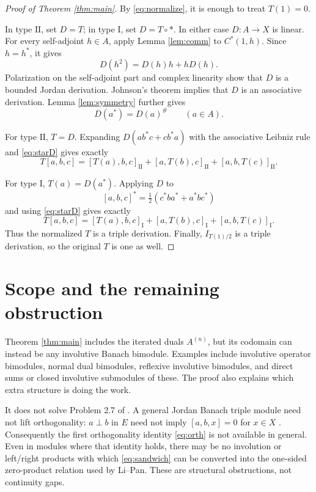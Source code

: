 \documentclass[11pt]{article}
\newcommand{\I}{\mathrm I}
\newcommand{\II}{\mathrm{II}}
\begin{document}
\begin{proof}[Proof of Theorem \ref{thm:main}]
By \eqref{eq:normalize}, it is enough to treat $T(1)=0$.

In type $\II$, set $D=T$; in type $\I$, set $D=T\circ *$.  In either
case $D:A\to X$ is linear.  For every self-adjoint $h\in A$, apply Lemma
\ref{lem:comm} to $C^*(1,h)$.  Since $h=h^*$, it gives
\[
 D(h^2)=D(h)h+hD(h).
\]
Polarization on the self-adjoint part and complex linearity show that $D$
is a bounded Jordan derivation.  Johnson's theorem
\cite[Theorem 6.3]{Johnson} implies that $D$ is an associative derivation.
Lemma \ref{lem:symmetry} further gives
\begin{equation}
 D(a^*)=D(a)^\#\qquad(a\in A). \label{eq:starD}
\end{equation}

For type $\II$, $T=D$.  Expanding $D(ab^*c+cb^*a)$ with the associative
Leibniz rule and \eqref{eq:starD} gives exactly
\[
 T[a,b,c]=[T(a),b,c]_{\II}+[a,T(b),c]_{\II}+[a,b,T(c)]_{\II}.
\]

For type $\I$, $T(a)=D(a^*)$.  Applying $D$ to
\[
 [a,b,c]^*=\tfrac12(c^*ba^*+a^*bc^*)
\]
and using \eqref{eq:starD} gives exactly
\[
 T[a,b,c]=[T(a),b,c]_{\I}+[a,T(b),c]_{\I}+[a,b,T(c)]_{\I}.
\]
Thus the normalized $T$ is a triple derivation.  Finally,
$I_{T(1)/2}$ is a triple derivation, so the original $T$ is one as well.
\end{proof}

\section{Scope and the remaining obstruction}

Theorem \ref{thm:main} includes the iterated duals $A^{(n)}$, but its
codomain can instead be any involutive Banach bimodule.  Examples include
involutive operator bimodules, normal dual bimodules, reflexive involutive
bimodules, and direct sums or closed involutive submodules of these.  The
proof also explains which extra structure is doing the work.

It does not solve Problem 2.7 of \cite{BFP}.  A general Jordan Banach triple
module need not lift orthogonality: $a\perp b$ in $E$ need not imply
$[a,b,x]=0$ for $x\in X$ \cite[Section 2]{PR}.  Consequently the first
orthogonality identity \eqref{eq:orth} is not available in general.  Even in
modules where that identity holds, there may be no involution or left/right
products with which \eqref{eq:sandwich} can be converted into the one-sided
zero-product relation used by Li--Pan.  These are structural obstructions,
not continuity gaps.
\end{document}
